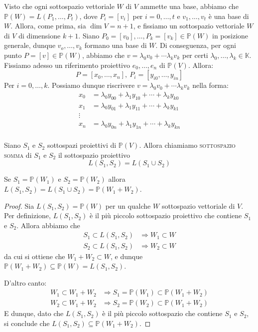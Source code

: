 \begin{oss}
Visto che ogni sottospazio vettoriale $W$ di $V$ ammette una base, abbiamo che $\mathbb{P}(W)=L(P_1,\dots,P_t)$, dove $P_i=[v_i]$ per $i=0,\dots,t$ e $v_1,\dots,v_t$ è una base di $W$. Allora, come prima, sia $\dim V=n+1$, e fissiamo un sottospazio vettoriale $W$ di $V$ di dimensione $k+1$. Siano $P_0=[v_0],\dots,P_k=[v_k] \in \mathbb{P}(W)$ in posizione generale, dunque $v_o,\dots,v_k$ formano una base di $W$. Di conseguenza, per ogni punto $P=[v] \in \mathbb{P}(W)$, abbiamo che $v=\lambda _0v_0+\cdots \lambda _kv_k$ per certi $\lambda_0,\dots,\lambda_k \in \mathbb{K}$. Fissiamo adesso un riferimento proiettivo $e_0,\dots,e_n$ di $\mathbb{P}(V)$. Allora:
$$P=[x_0,\dots,x_n],\ P_i=[y_{i0},\dots,y_{in}]$$
Per $i=0,\dots,k$. Possiamo dunque riscrivere $v=\lambda _0v_0+\cdots \lambda _kv_k$ nella forma:
\begin{align*}
x_0&=\lambda_0y_{00}+\lambda_1y_{10}+\cdots+\lambda_ky_{k0}\\
x_1&=\lambda_0y_{01}+\lambda_1y_{11}+\cdots+\lambda_ky_{k1}\\
\vdots\\
x_n&=\lambda_0y_{0n}+\lambda_1y_{1n}+\cdots+\lambda_ky_{kn}\\
\end{align*}
\end{oss}

\begin{defn}
Siano $S_1$ e $S_2$ sottospazi proiettivi di $\mathbb{P}(V)$. Allora chiamiamo \textsc{sottospazio somma} di $S_1$ e $S_2$ il sottospazio proiettivo
$$L(S_1,S_2)=L(S_1 \cup S_2)$$
\end{defn}

\begin{lm}
Se $S_1=\mathbb{P}(W_1)$ e $S_2=\mathbb{P}(W_2)$ allora $L(S_1,S_2)=L(S_1 \cup S_2)=\mathbb{P}(W_1+W_2)$.
\end{lm}

\begin{proof}
Sia $L(S_1,S_2)=\mathbb{P}(W)$ per un qualche $W$ sottospazio vettoriale di $V$. Per definizione, $L(S_1,S_2)$ è il più piccolo sottospazio proiettivo che contiene $S_1$ e $S_2$. Allora abbiamo che
\begin{align*}
S_1 \subset L(S_1,S_2) &\Rightarrow W_1 \subset W\\
S_2 \subset L(S_1,S_2) &\Rightarrow W_2 \subset W
\end{align*}
da cui si ottiene che $W_1+W_2\subset W$, e dunque $\mathbb{P}(W_1+W_2)\subseteq \mathbb{P}(W)=L(S_1,S_2)$.

D'altro canto:
\begin{align*}
W_1 \subset W_1+W_2 &\Rightarrow S_1=\mathbb{P}(W_1) \subset \mathbb{P}(W_1+W_2)\\
W_2 \subset W_1+W_2 &\Rightarrow S_2=\mathbb{P}(W_2) \subset \mathbb{P}(W_1+W_2)
\end{align*}
E dunque, dato che $L(S_1,S_2)$ è il più piccolo sottospazio che contiene $S_1$ e $S_2$, si conclude che $L(S_1,S_2)\subseteq \mathbb{P}(W_1+W_2)$.
\end{proof}

